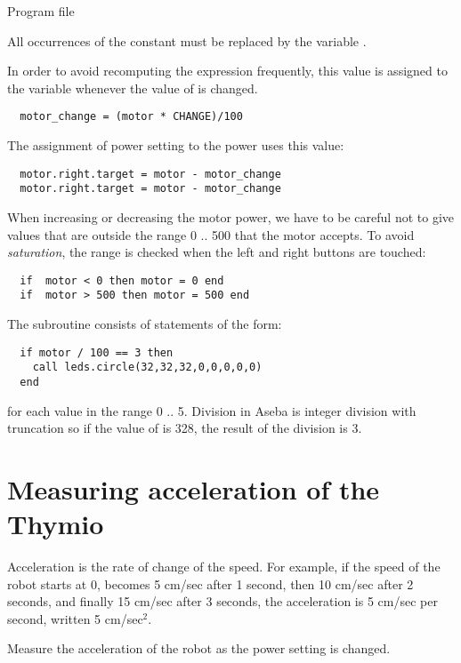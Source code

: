 {\raggedleft \hfill Program file }

All occurrences of the constant  must be replaced by the
variable .

In order to avoid recomputing the expression 
frequently, this value is assigned to the variable 
whenever the value of  is changed.

\begin{verbatim}
  motor_change = (motor * CHANGE)/100
\end{verbatim}
The assignment of power setting to the power uses this value:
\begin{verbatim}
  motor.right.target = motor - motor_change
  motor.right.target = motor - motor_change
\end{verbatim}

When increasing or decreasing the motor power, we have to be careful not
to give values that are outside the range 0 .. 500 that the motor
accepts. To avoid \emph{saturation}, the range is checked when the
left and right buttons are touched:

\begin{verbatim}
  if  motor < 0 then motor = 0 end
  if  motor > 500 then motor = 500 end
\end{verbatim}

The subroutine  consists of statements of the
form:\label{p.leds}

\begin{verbatim}
  if motor / 100 == 3 then
    call leds.circle(32,32,32,0,0,0,0,0)
  end
\end{verbatim}
for each value in the range 0 .. 5. Division in Aseba is integer
division with truncation so if the value of  is 328, the result
of the division is 3.

\section{Measuring acceleration of the Thymio}

Acceleration is the rate of change of the speed. For example, if the
speed of the robot starts at 0, becomes 5 cm/sec after 1 second, then 10
cm/sec after 2 seconds, and finally 15 cm/sec after 3 seconds, the
acceleration is 5 cm/sec per second, written 5 cm/sec$^2$.

\pagebreak[4]


Measure the acceleration of the robot as the power setting is changed.

